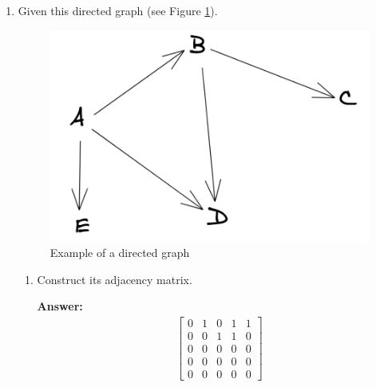 \documentclass{article}
\newenvironment{QandA}{\begin{enumerate}[label=\arabic*.]}{\end{enumerate}}
\newenvironment{InnerQandA}{\begin{enumerate}[label=\roman*.]}{\end{enumerate}}
\newenvironment{answer}{\par\normalfont \textbf{Answer:}}{}
\begin{document}
\begin{QandA}
\begin{InnerQandA}
        \item How are they used in deep learning?
        \begin{answer}
            While in theory there is nothing stopping you from applying bagging and boosting to deep neural networks, in practice it is almost infeasible. \\\\
            Historically, these ensembling techniques have been introduced by combining many weak (slightly above random performance), but inexpensive learners such as decision trees. \\\\
            Today, deep neural networks are so large that even a single model is distributed among many nodes for distributed training. To consider training hundreds of networks for the purposes of boosting/bagging is almost unimaginable. Even if we somehow train them, at inference time the predictions can take from seconds to several minutes, deeming them extremely impractical (e.g. self-driving cars). \\\\
            Moreover, it is known that neural networks are very sample inefficient, requiring huge datasets which can take weeks to months to train on. This means that training in an iterative manner, such as in boosting, could take months to years to finish.
        \end{answer}
    \end{InnerQandA}

    \item Given this directed graph (see Figure \ref{fig:directed-graph}).
    \begin{figure}[htb!]
        \centering
        \includegraphics[width=0.3\columnwidth]{img/directed-graph.png}
        \caption{Example of a directed graph}
        \label{fig:directed-graph}
    \end{figure}
    \begin{InnerQandA}
        \item Construct its adjacency matrix.
        \begin{answer} 
            \begin{align*}
                \begin{bmatrix}
                    0 & 1 & 0 & 1 & 1 \\
                    0 & 0 & 1 & 1 & 0 \\
                    0 & 0 & 0 & 0 & 0 \\
                    0 & 0 & 0 & 0 & 0 \\
                    0 & 0 & 0 & 0 & 0
                \end{bmatrix}
            \end{align*}
            

\end{answer}
\end{InnerQandA}
\end{QandA}
\end{document}
